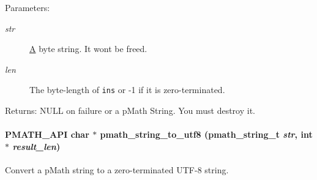 \begin{Desc}
\item[Parameters:]
\begin{description}
\item[{\em str}]\hyperlink{class_a}{A} byte string. It wont be freed. \item[{\em len}]The byte-length of {\tt ins} or -1 if it is zero-terminated. \end{description}
\end{Desc}
\begin{Desc}
\item[Returns:]NULL on failure or a pMath String. You must destroy it. \end{Desc}
\hypertarget{group__strings_g881c2e70d81dd43a79d5ccbecc933e79}{
\paragraph[{pmath\_\-string\_\-to\_\-utf8}]{\setlength{\rightskip}{0pt plus 5cm}PMATH\_\-API char $\ast$ pmath\_\-string\_\-to\_\-utf8 ({\bf pmath\_\-string\_\-t} {\em str}, \/  int $\ast$ {\em result\_\-len})}\hfill}
\label{group__strings_g881c2e70d81dd43a79d5ccbecc933e79}


Convert a pMath string to a zero-terminated UTF-8 string. 

